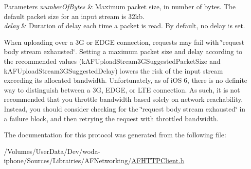 \begin{DoxyParams}{Parameters}
{\em number\-Of\-Bytes} & Maximum packet size, in number of bytes. The default packet size for an input stream is 32kb. \\
\hline
{\em delay} & Duration of delay each time a packet is read. By default, no delay is set.\\
\hline
\end{DoxyParams}
When uploading over a 3\-G or E\-D\-G\-E connection, requests may fail with \char`\"{}request body stream exhausted\char`\"{}. Setting a maximum packet size and delay according to the recommended values ({\ttfamily k\-A\-F\-Upload\-Stream3\-G\-Suggested\-Packet\-Size} and {\ttfamily k\-A\-F\-Upload\-Stream3\-G\-Suggested\-Delay}) lowers the risk of the input stream exceeding its allocated bandwidth. Unfortunately, as of i\-O\-S 6, there is no definite way to distinguish between a 3\-G, E\-D\-G\-E, or L\-T\-E connection. As such, it is not recommended that you throttle bandwidth based solely on network reachability. Instead, you should consider checking for the \char`\"{}request body stream exhausted\char`\"{} in a failure block, and then retrying the request with throttled bandwidth. 

The documentation for this protocol was generated from the following file\-:\begin{DoxyCompactItemize}
\item 
/\-Volumes/\-User\-Data/\-Dev/woda-\/iphone/\-Sources/\-Librairies/\-A\-F\-Networking/\hyperlink{_a_f_h_t_t_p_client_8h}{A\-F\-H\-T\-T\-P\-Client.\-h}\end{DoxyCompactItemize}
